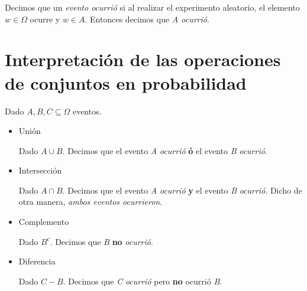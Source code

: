 

Decimos que un \textit{evento ocurrió} si al realizar el experimento aleatorio, el elemento $w \in \Omega$ ocurre y $w \in A$. Entonces decimos que \textit{A ocurrió}.


\section{Interpretación de las operaciones de conjuntos en probabilidad}

Dado $A, B, C \subseteq \Omega$ eventos.
\begin{itemize}
  \item Unión

    Dado $A \cup B$. Decimos que el evento \textit{A} \textit{ocurrió} \textbf{ó} el evento \textit{B} \textit{ocurrió}.
  \item Intersección

    Dado $A \cap B$. Decimos que el evento \textit{A} \textit{ocurrió} \textbf{y} el evento \textit{B} \textit{ocurrió}. Dicho de otra manera, \textit{ambos eventos ocurrieron}.
  \item Complemento

    Dado $B^c$. Decimos que \textit{B} \textbf{no} \textit{ocurrió}.
  \item Diferencia

    Dado $C - B$. Decimos que \textit{C} \textit{ocurrió} pero \textbf{no} ocurrió \textit{B}.

\end{itemize}

